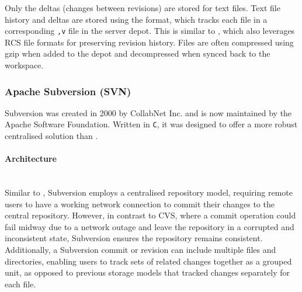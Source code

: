 Only the deltas (changes between revisions) are stored for text files. Text file history and deltas are stored using the  format, which tracks each file in a corresponding \lstinline{,v} file in the server depot. This is similar to , which also leverages RCS file formats for preserving revision history. Files are often compressed using gzip when added to the depot and decompressed when synced back to the workspace.





\subsubsection{Apache Subversion (SVN)}
\label{sec:svn}
Subversion was created in 2000 by CollabNet Inc. and is now maintained by the Apache Software Foundation. Written in \lstinline{C}, it was designed to offer a more robust centralised solution than \cite{stopak_2019}.
\paragraph{Architecture}
\hfill\medskip\\
Similar to , Subversion employs a centralised repository model, requiring remote users to have a working network connection to commit their changes to the central repository. However, in contrast to CVS, where a commit operation could fail midway due to a network outage and leave the repository in a corrupted and inconsistent state, Subversion ensures the repository remains consistent. Additionally, a Subversion commit or revision can include multiple files and directories, enabling users to track sets of related changes together as a grouped unit, as opposed to previous storage models that tracked changes separately for each file.
\smallskip

